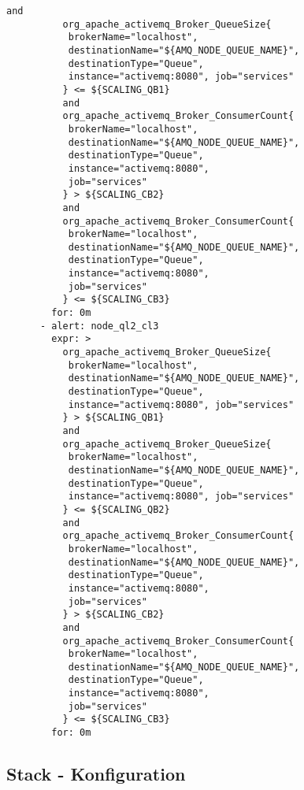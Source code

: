 \begin{lstlisting}[style=bashStyle,caption={alert-unparsed.yml},label=lst:alert-unparsed]
          and 
          org_apache_activemq_Broker_QueueSize{
           brokerName="localhost", 
           destinationName="${AMQ_NODE_QUEUE_NAME}",
           destinationType="Queue", 
           instance="activemq:8080", job="services"
          } <= ${SCALING_QB1}
          and 
          org_apache_activemq_Broker_ConsumerCount{
           brokerName="localhost",
           destinationName="${AMQ_NODE_QUEUE_NAME}", 
           destinationType="Queue",
           instance="activemq:8080", 
           job="services"
          } > ${SCALING_CB2}
          and
          org_apache_activemq_Broker_ConsumerCount{
           brokerName="localhost",
           destinationName="${AMQ_NODE_QUEUE_NAME}", 
           destinationType="Queue",
           instance="activemq:8080", 
           job="services"
          } <= ${SCALING_CB3}
        for: 0m
      - alert: node_ql2_cl3
        expr: >
          org_apache_activemq_Broker_QueueSize{
           brokerName="localhost", 
           destinationName="${AMQ_NODE_QUEUE_NAME}",
           destinationType="Queue", 
           instance="activemq:8080", job="services"
          } > ${SCALING_QB1}
          and 
          org_apache_activemq_Broker_QueueSize{
           brokerName="localhost", 
           destinationName="${AMQ_NODE_QUEUE_NAME}",
           destinationType="Queue", 
           instance="activemq:8080", job="services"
          } <= ${SCALING_QB2}
          and 
          org_apache_activemq_Broker_ConsumerCount{
           brokerName="localhost",
           destinationName="${AMQ_NODE_QUEUE_NAME}", 
           destinationType="Queue",
           instance="activemq:8080", 
           job="services"
          } > ${SCALING_CB2}
          and
          org_apache_activemq_Broker_ConsumerCount{
           brokerName="localhost",
           destinationName="${AMQ_NODE_QUEUE_NAME}", 
           destinationType="Queue",
           instance="activemq:8080", 
           job="services"
          } <= ${SCALING_CB3}
        for: 0m 
\end{lstlisting}


\subsection{Stack - Konfiguration}

